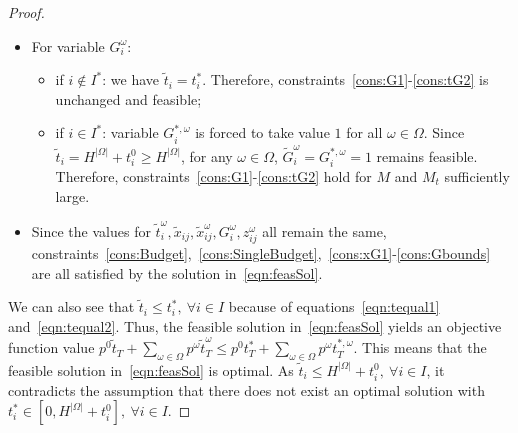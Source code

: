 \documentclass[11pt]{article}
\begin{document}
{\begin{proof}
\begin{itemize}
\begin{itemize}
		        \item \(i \notin I^*, k \in I^*\): since \(t_i^* \leq H^{|\Omega|} + t_i^0\), \(\tilde{x}_{ij} \geq 0\) and \(t_k^0 - t_i^0 \geq D_{ik}\), we have
		        \[\tilde{t}_k - \tilde{t}_i = H^{|\Omega|} + t_k^0 - t_i^* \geq H^{|\Omega|} + t_k^0 - \left(H^{|\Omega|} + t_i^0 \right) = t_k^0 - t_i^0 \geq D_{ik} \geq D_{ik} \left (1 - \sum_{j \in J_i} e_{ij} \tilde{x}_{ij} \right ); \]
		        \item \(i,k \notin I^*\): the constraint is unchanged and feasible;
		    \end{itemize}
		    \item For variable \(G_i^\omega\):
    		    \begin{itemize}
    		        \item if \(i \notin I^*\): we have \(\tilde{t}_i = t_i^*\). Therefore, constraints~\eqref{cons:G1}-\eqref{cons:tG2} is unchanged and feasible;
    		        \item if \(i \in I^*\): variable \(G_i^{*,\omega}\) is forced to take value \(1\) for all \(\omega \in \Omega\). Since \(\tilde{t}_i = H^{|\Omega|} + t_i^0 \geq H^{|\Omega|}\), for any \(\omega \in \Omega\), \(\tilde{G}_i^\omega = G_i^{*,\omega} = 1\) remains feasible. Therefore, constraints~\eqref{cons:G1}-\eqref{cons:tG2} hold for $M$ and $M_t$ sufficiently large.
    		    \end{itemize}
		    \item Since the values for \(\tilde{t}_i^\omega, \tilde{x}_{ij}, \tilde{x}_{ij}^\omega, G_i^\omega, z_{ij}^\omega\) all remain the same, constraints~\eqref{cons:Budget},~\eqref{cons:SingleBudget},~\eqref{cons:xG1}-\eqref{cons:Gbounds} are all satisfied by the solution in~\eqref{eqn:feasSol}.
		\end{itemize}
		We can also see that \(\tilde{t}_i \leq t_i^* ,\ \forall i \in I\) because of equations~\eqref{eqn:tequal1} and~\eqref{eqn:tequal2}. Thus, the feasible solution in~\eqref{eqn:feasSol} yields an objective function value \(p^0 \tilde{t}_T + \sum_{\omega \in \Omega} p^\omega \tilde{t}_T^{\omega} \le p^0 t_T^* + \sum_{\omega \in \Omega} p^\omega t_T^{*,\omega}\). This means that the feasible solution in~\eqref{eqn:feasSol} is optimal. As \(\tilde{t}_i \leq H^{|\Omega|} + t_i^0,\ \forall i \in I\), it contradicts the assumption that there does not exist an optimal solution with \(t^*_i \in [0,H^{|\Omega|} + t_i^0],\ \forall i \in I\). 

\end{proof}}
\end{document}
